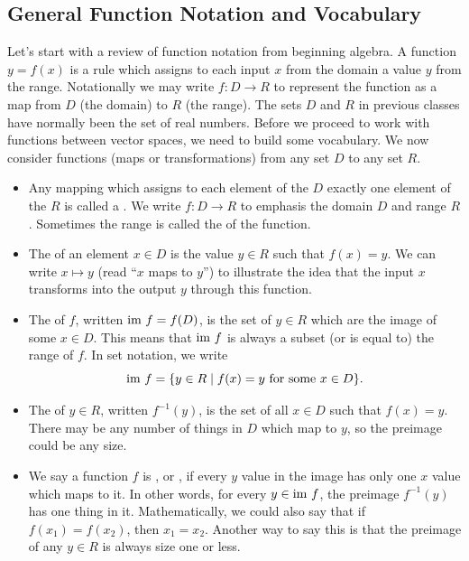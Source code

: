 \subsection{General Function Notation and Vocabulary}
Let's start with a review of function notation from beginning algebra. 
A function $y=f(x)$ is a rule which assigns to each input $x$ from the domain a value $y$ from the range. 
Notationally we may write $f:D\to R$ to represent the function as a map from $D$ (the domain) to $R$ (the range).  
The sets $D$ and $R$ in previous classes have normally been the set of real numbers. 
Before we proceed to work with functions between vector spaces, we need to build some vocabulary. 
We now consider functions (maps or transformations) from any set $D$ to any set $R$.
\begin{definition}
  \begin{itemize}
  \item Any mapping which assigns to each element of the  $D$ exactly one element of the  $R$ is called a . We write $f:D\to R$ to emphasis the domain $D$ and range $R$.  Sometimes the range is called the  of the function.

  \item The  of an element $x\in D$ is the value $y\in R$ such that $f(x)=y$. We can write $x\mapsto y$ (read ``$x$ maps to $y$'') to illustrate the idea that the input $x$ transforms into the output $y$ through this function.

  \item The  of $f$, written $\text{im } f=f(D)$, is the set of $y\in R$ which are the image of some $x\in D$.  This means that $\text{im } f$ is always a subset (or is equal to) the range of $f$.  In set notation, we write $$\text{im } f = \{y\in R \mid f(x)=y \text{ for some $x\in D$}\}.$$

  \item The  of $y\in R$, written $f^{-1}(y)$, is the set of all $x\in D$ such that $f(x)=y$.  There may be any number of things in $D$ which map to $y$, so the preimage could be any size.
	
  \item We say a function $f$ is , or , if every $y$ value in the image has only one $x$ value which maps to it.  In other words, for every $y\in \text{im } f$, the preimage $f^{-1}(y)$ has one thing in it.  Mathematically, we could also say that if $f(x_1)=f(x_2)$, then $x_1=x_2$.  Another way to say this is that the preimage of any $y\in R$ is always size one or less.


\end{itemize}
\end{definition}
